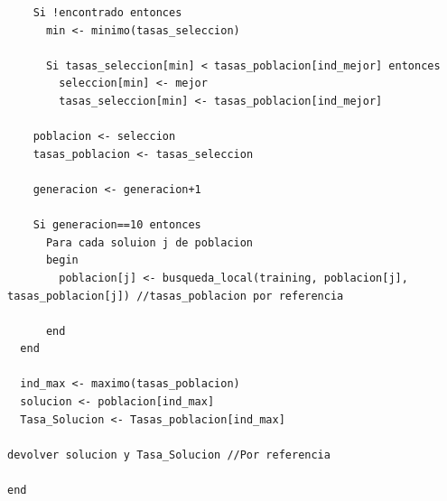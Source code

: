 \begin{lstlisting}
    Si !encontrado entonces
      min <- minimo(tasas_seleccion)

      Si tasas_seleccion[min] < tasas_poblacion[ind_mejor] entonces
        seleccion[min] <- mejor
        tasas_seleccion[min] <- tasas_poblacion[ind_mejor]

    poblacion <- seleccion
    tasas_poblacion <- tasas_seleccion
    
    generacion <- generacion+1
    
    Si generacion==10 entonces
      Para cada soluion j de poblacion
      begin
        poblacion[j] <- busqueda_local(training, poblacion[j], tasas_poblacion[j]) //tasas_poblacion por referencia
        
      end
  end

  ind_max <- maximo(tasas_poblacion)
  solucion <- poblacion[ind_max]
  Tasa_Solucion <- Tasas_poblacion[ind_max]

devolver solucion y Tasa_Solucion //Por referencia

end
\end{lstlisting}

